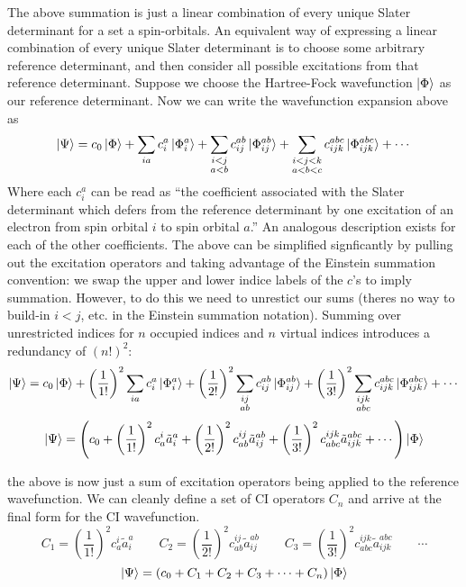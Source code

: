 \documentclass{article}
\newcommand{\lp}{\left(}
\newcommand{\rp}{\right)}
\begin{document}
The above summation is just a linear combination of every unique Slater determinant for a set a spin-orbitals. 
An equivalent way of expressing a linear combination of every unique Slater determinant is to choose some arbitrary reference determinant, 
    and then consider all possible excitations from that reference determinant. 
Suppose we choose the Hartree-Fock wavefunction  $\ket{\Phi}$ as our reference determinant.
Now we can write the wavefunction expansion above as 
\[ \ket{\Psi} = c_0 \ket{\Phi} + \sum_{ia} c_i^a \ket{\Phi_i^a} +  \sum_{ \substack{i < j \\ a < b}} c_{ij}^{ab} \ket{\Phi_{ij}^{ab}} + \sum_{ \substack{i < j < k \\ a < b < c }} c_{ijk}^{abc} \ket{\Phi_{ijk}^{abc}} + \cdots \]
Where each $c_i^a$ can be read as ``the coefficient associated with the Slater determinant which defers from the reference determinant 
    by one excitation of an electron from spin orbital $i$ to spin orbital $a$.''
An analogous description exists for each of the other coefficients.
The above can be simplified signficantly by pulling out the excitation operators and taking advantage of the Einstein summation convention: 
    we swap the upper and lower indice labels of the $c$'s to imply summation.
However, to do this we need to unrestict our sums (theres no way to build-in $i <j$, etc. in the Einstein summation notation). 
Summing over unrestricted indices for $n$ occupied indices and $n$ virtual indices introduces a redundancy of $(n!)^2$:
\[ \ket{\Psi} = c_0 \ket{\Phi} + \left(\frac{1}{1!}\right)^2 \sum_{ia} c_i^a \ket{\Phi_i^a} +  \left(\frac{1}{2!}\right)^2\sum_{ \substack{ij \\ ab}} c_{ij}^{ab} \ket{\Phi_{ij}^{ab}} + \left(\frac{1}{3!}\right)^2 \sum_{ \substack{ijk \\ abc}} c_{ijk}^{abc} \ket{\Phi_{ijk}^{abc}} + \cdots \]
\[ \ket{\Psi} = \left(c_0 + \left(\frac{1}{1!}\right)^2 c_a^i \tilde{a}_{i}^{a} +  \left(\frac{1}{2!}\right)^2c_{ab}^{ij} \tilde{a}_{ij}^{ab} + \left(\frac{1}{3!}\right)^2 c_{abc}^{ijk} \tilde{a}_{ijk}^{abc} + \cdots\right) \ket{\Phi}  \]

the above is now just a sum of excitation operators being applied to the reference wavefunction. 
We can cleanly define a set of CI operators $C_n$ and arrive at the final form for the CI wavefunction. 
\[ C_1 = \left(\frac{1}{1!}\right)^2 c_a^i \tilde{a}_{i}^{a} \quad \quad C_2 = \left(\frac{1}{2!}\right)^2c_{ab}^{ij} \tilde{a}_{ij}^{ab} \quad \quad C_3 = \left(\frac{1}{3!}\right)^2 c_{abc}^{ijk} \tilde{a}_{ijk}^{abc} \quad \quad \cdots  \]
\[ \ket{\Psi} = \lp c_0 + C_1 + C_2 + C_3 + \cdots + C_n \rp \ket{\Phi} \]
\end{document}
